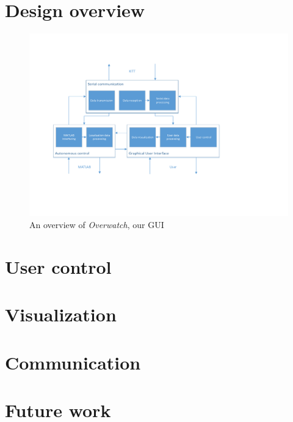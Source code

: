 \documentclass[11pt,titlepage]{report}
\begin{document}
\section{Design overview}

\begin{figure}[H]
	\centering
	\includegraphics[width=\linewidth]{resource/overwatch-overview.pdf}
	\caption{An overview of \emph{Overwatch}, our GUI}
	\label{fig:system-overview}
\end{figure}

\section{User control}

\section{Visualization}

\section{Communication}

\section{Future work}
\end{document}
